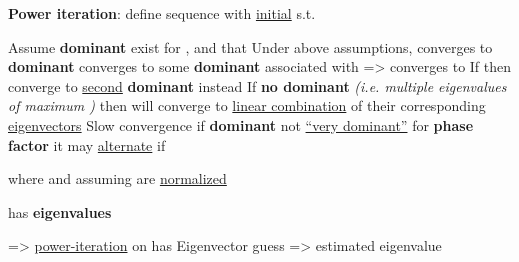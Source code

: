 \textbf{Power iteration}: define sequence
with \ul{initial}  s.t. 
\begin{itemize}
      \vItem
            Assume \textbf{dominant}  exist
            for , and that
      \vItem
            Under above assumptions,
            converges to \textbf{dominant }
      \vItem
             converges to some
            \textbf{dominant}  associated with
             =>
             converges to
      \vItem
            If 
            then 
            converge to \ul{second} \textbf{dominant}  instead
      \vItem
            If \textbf{no dominant \iMbox{\lambda}} \emph{(i.e. multiple
                  eigenvalues of maximum \iMbox{|\lambda|})} then
             will converge to \ul{linear combination}
            of their corresponding \ul{eigenvectors}
      \vItem
            Slow convergence if \textbf{dominant } not \ul{``very dominant''}
      \vItem
            for \textbf{phase factor}  it may \ul{alternate} if 
            \begin{itemize}

                  \vItem
                        where  and assuming
                         are \ul{normalized}
            \end{itemize}
      \vItem
             has \textbf{eigenvalues} \iMbox{\lambda-\sigma}

            => \ul{power-iteration} on  has 
      \vItem
            Eigenvector guess => estimated eigenvalue
\end{itemize}

